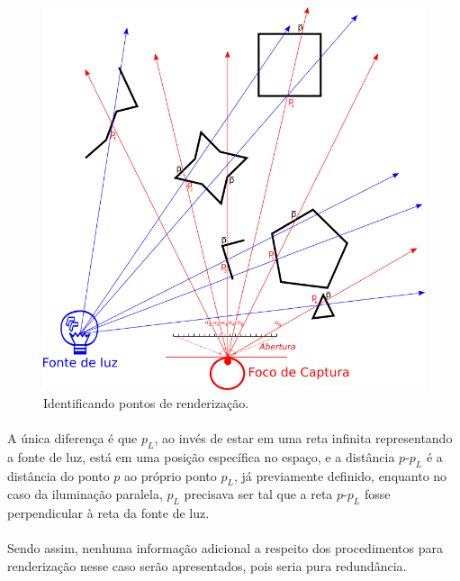 \documentclass{article}
\begin{document}
	\begin{figure}[h]
		\centering
		\includegraphics[scale=0.8]{Renderizacao-2D-1D-radial}
		\caption{Identificando pontos de renderização.}
		\label{fig:rend-rad}
	\end{figure}
	
	\paragraph{}
	A única diferença é que $p_L$, ao invés de estar em uma reta infinita representando a fonte de luz, está em uma posição específica no espaço, e a distância $p$-$p_L$ é a distância do ponto $p$ ao próprio ponto $p_L$, já previamente definido, enquanto no caso da iluminação paralela, $p_L$ precisava ser tal que a reta $p$-$p_L$ fosse perpendicular à reta da fonte de luz.
	
	\paragraph{}
	Sendo assim, nenhuma informação adicional a respeito dos procedimentos para renderização nesse caso serão apresentados, pois seria pura redundância.
	
\end{document}
